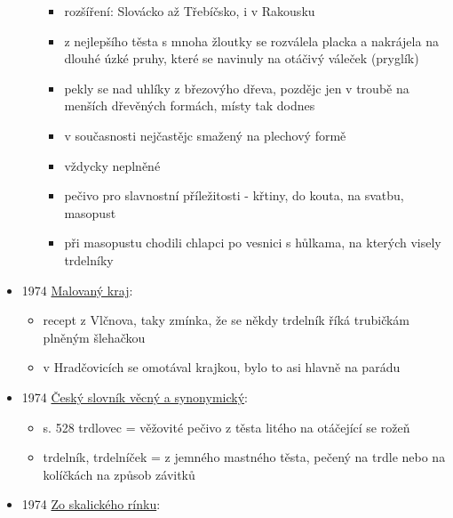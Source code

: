 \begin{itemize}
\begin{itemize}
    \begin{itemize}
    \tightlist
    \item
      rozšíření: Slovácko až Třebíčsko, i v Rakousku
    \item
      z nejlepšího těsta s mnoha žloutky se rozválela placka a nakrájela
      na dlouhé úzké pruhy, které se navinuly na otáčivý váleček
      (pryglík)
    \item
      pekly se nad uhlíky z březovýho dřeva, pozdějc jen v troubě na
      menších dřevěných formách, místy tak dodnes
    \item
      v současnosti nejčastějc smažený na plechový formě
    \item
      vždycky neplněné
    \item
      pečivo pro slavnostní příležitosti - křtiny, do kouta, na svatbu,
      masopust
    \item
      při masopustu chodili chlapci po vesnici s hůlkama, na kterých
      visely trdelníky
    \end{itemize}
  \end{itemize}
\item
  1974
  \href{https://ndk.cz/uuid/uuid:630185b0-f30f-11e3-a012-005056825209}{Malovaný
  kraj}:

  \begin{itemize}
  \tightlist
  \item
    recept z Vlčnova, taky zmínka, že se někdy trdelník říká trubičkám
    plněným šlehačkou
  \item
    v Hradčovicích se omotával krajkou, bylo to asi hlavně na parádu
  \end{itemize}
\item
  1974
  \href{https://ceskadigitalniknihovna.cz/uuid/uuid:9a981180-f289-11ea-9c2e-005056827e51}{Český
  slovník věcný a synonymický}:

  \begin{itemize}
  \tightlist
  \item
    s. 528 trdlovec = věžovité pečivo z těsta litého na otáčející se
    rožeň
  \item
    trdelník, trdelníček = z jemného mastného těsta, pečený na trdle
    nebo na kolíčkách na způsob závitků
  \end{itemize}
\item
  1974
  \href{https://dikda.snk.sk/uuid/uuid:1a7c4454-d0d7-4b19-8ca8-1f1e1bda6ad7}{Zo
  skalického rínku}:


\end{itemize}
